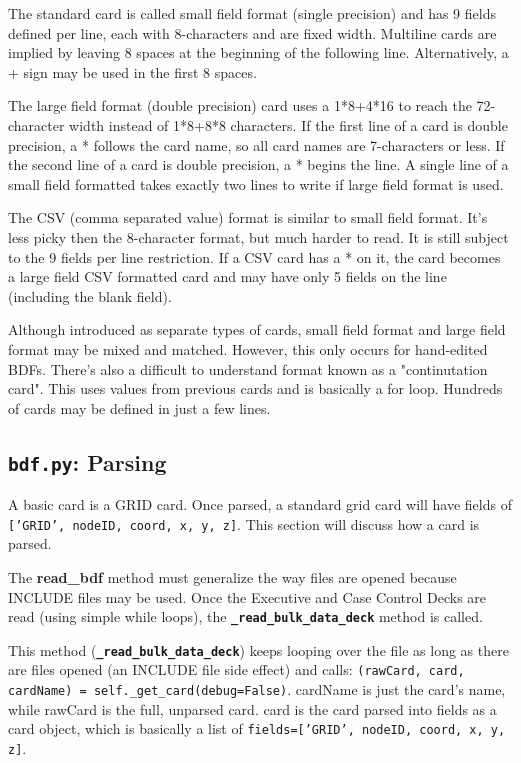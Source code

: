      The standard card is called small field format (single precision) and has 9 fields defined per line, each with 8-characters and are fixed width.  Multiline cards are implied by leaving 8 spaces at the beginning of the following line.  Alternatively, a + sign may be used in the first 8 spaces.
     
     The large field format (double precision) card uses a 1*8+4*16 to reach the 72-character width instead of 1*8+8*8 characters.  If the first line of a card is double precision, a * follows the card name, so all card names are 7-characters or less.  If the second line of a card is double precision, a * begins the line.  A single line of a small field formatted takes exactly two lines to write if large field format is used.
     
     The CSV (comma separated value) format is similar to small field format.  It's less picky then the 8-character format, but much harder to read.  It is still subject to the 9 fields per line restriction.  If a CSV card has a * on it, the card becomes a large field CSV formatted card and may have only 5 fields on the line (including the blank field).
     
     Although introduced as separate types of cards, small field format and large field format may be mixed and matched.  However, this only occurs for hand-edited BDFs.  There's also a difficult to understand format known as a "continutation card".  This uses values from previous cards and is basically a for loop.  Hundreds of cards may be defined in just a few lines.
     
 \subsection{{\tt bdf.py}: Parsing}
     A basic card is a GRID card.  Once parsed, a standard grid card will have fields of {\tt ['GRID', nodeID, coord, x, y, z]}.  This section will discuss how a card is parsed.  
     
     The {\bf read_bdf} method must generalize the way files are opened because INCLUDE files may be used.  Once the Executive and Case Control Decks are read (using simple while loops), the {\bf \tt \_read\_bulk\_data\_deck} method is called.
     
     This method ({\bf \tt \_read\_bulk\_data\_deck}) keeps looping over the file as long as there are files opened (an INCLUDE file side effect) and calls:
     {\tt (rawCard, card, cardName) = self.\_get\_card(debug=False)}.  cardName is just the card's name, while rawCard is the full, unparsed card.  card is the card parsed into fields as a card object, which is basically a list of {\tt fields=['GRID', nodeID, coord, x, y, z]}.

